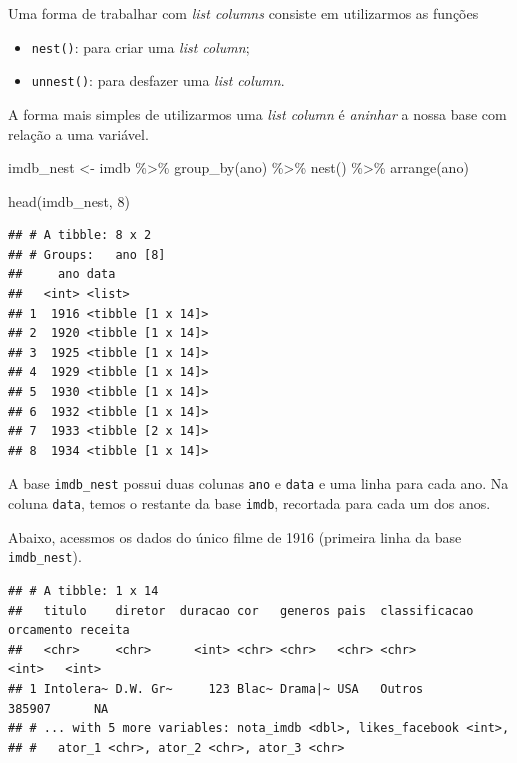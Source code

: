 \documentclass[
]{book}
\newenvironment{Shaded}{\begin{snugshade}}{\end{snugshade}}
\newcommand{\DecValTok}[1]{\textcolor[rgb]{0.00,0.00,0.81}{#1}}
\newcommand{\FunctionTok}[1]{\textcolor[rgb]{0.00,0.00,0.00}{#1}}
\newcommand{\NormalTok}[1]{#1}
\newcommand{\OtherTok}[1]{\textcolor[rgb]{0.56,0.35,0.01}{#1}}
\newcommand{\SpecialCharTok}[1]{\textcolor[rgb]{0.00,0.00,0.00}{#1}}
\begin{document}
Uma forma de trabalhar com \emph{list columns} consiste em utilizarmos as funções

\begin{itemize}
\item
  \texttt{nest()}: para criar uma \emph{list column};
\item
  \texttt{unnest()}: para desfazer uma \emph{list column}.
\end{itemize}

A forma mais simples de utilizarmos uma \emph{list column} é \emph{aninhar} a nossa base com relação a uma variável.

\begin{Shaded}
\begin{Highlighting}[]
\NormalTok{imdb\_nest }\OtherTok{\textless{}{-}}\NormalTok{ imdb }\SpecialCharTok{\%\textgreater{}\%}
  \FunctionTok{group\_by}\NormalTok{(ano) }\SpecialCharTok{\%\textgreater{}\%}
  \FunctionTok{nest}\NormalTok{() }\SpecialCharTok{\%\textgreater{}\%} 
  \FunctionTok{arrange}\NormalTok{(ano)}

\FunctionTok{head}\NormalTok{(imdb\_nest, }\DecValTok{8}\NormalTok{)}
\end{Highlighting}
\end{Shaded}

\begin{verbatim}
## # A tibble: 8 x 2
## # Groups:   ano [8]
##     ano data             
##   <int> <list>           
## 1  1916 <tibble [1 x 14]>
## 2  1920 <tibble [1 x 14]>
## 3  1925 <tibble [1 x 14]>
## 4  1929 <tibble [1 x 14]>
## 5  1930 <tibble [1 x 14]>
## 6  1932 <tibble [1 x 14]>
## 7  1933 <tibble [2 x 14]>
## 8  1934 <tibble [1 x 14]>
\end{verbatim}

A base \texttt{imdb\_nest} possui duas colunas \texttt{ano} e \texttt{data} e uma linha para cada ano. Na coluna \texttt{data}, temos o restante da base \texttt{imdb}, recortada para cada um dos anos.

Abaixo, acessmos os dados do único filme de 1916 (primeira linha da base \texttt{imdb\_nest}).

\begin{Shaded}
\end{Shaded}

\begin{verbatim}
## # A tibble: 1 x 14
##   titulo    diretor  duracao cor   generos pais  classificacao orcamento receita
##   <chr>     <chr>      <int> <chr> <chr>   <chr> <chr>             <int>   <int>
## 1 Intolera~ D.W. Gr~     123 Blac~ Drama|~ USA   Outros           385907      NA
## # ... with 5 more variables: nota_imdb <dbl>, likes_facebook <int>,
## #   ator_1 <chr>, ator_2 <chr>, ator_3 <chr>
\end{verbatim}
\end{document}
